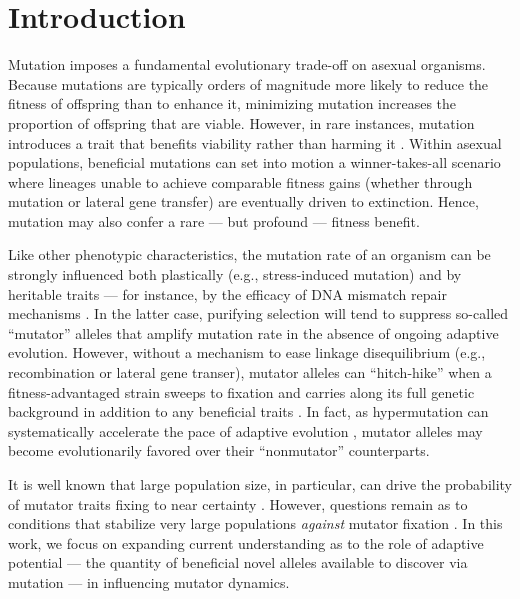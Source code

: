 \section{Introduction} \label{sec:introduction}

Mutation imposes a fundamental evolutionary trade-off on asexual organisms.
Because mutations are typically orders of magnitude more likely to reduce the fitness of offspring than to enhance it, minimizing mutation increases the proportion of offspring that are viable.
However, in rare instances, mutation introduces a trait that benefits viability rather than harming it \citep{zeyl2004capturing,rozen2002fitness} .
Within asexual populations, beneficial mutations can set into motion a winner-takes-all scenario where lineages unable to achieve comparable fitness gains (whether through mutation or lateral gene transfer) are eventually driven to extinction.
Hence, mutation may also confer a rare --- but profound --- fitness benefit.

Like other phenotypic characteristics, the mutation rate of an organism can be strongly influenced both plastically (e.g., stress-induced mutation) \citep{ram2012evolution} and by heritable traits --- for instance, by the efficacy of DNA mismatch repair mechanisms \citep{miller1998mutators}.
In the latter case, purifying selection will tend to suppress so-called ``mutator'' alleles that amplify mutation rate in the absence of ongoing adaptive evolution.
However, without a mechanism to ease linkage disequilibrium (e.g., recombination or lateral gene transer), mutator alleles can  ``hitch-hike'' when a fitness-advantaged strain sweeps to fixation and carries along its full genetic background in addition to any beneficial traits \citep{smith1974hitchhiking,johnson1999beneficial,gentile2011competition}.
In fact, as hypermutation can systematically accelerate the pace of adaptive evolution \citep{orr2000rate}, mutator alleles may become evolutionarily favored over their ``nonmutator'' counterparts.

It is well known that large population size, in particular, can drive the probability of mutator traits fixing to near certainty \citep{raynes2018sign,tenaillon1999mutators,andre2006evolution,good2016evolution}.
However, questions remain as to conditions that stabilize very large populations \textit{against} mutator fixation \citep{raynes2012contrasting,raynes2019migration,tanaka2003evolution}.
In this work, we focus on expanding current understanding as to the role of adaptive potential --- the quantity of beneficial novel alleles available to discover via mutation --- in influencing mutator dynamics.

